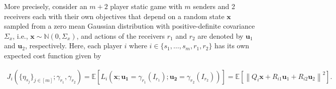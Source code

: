 \documentclass[12pt,journal,onecolumn]{IEEEtran}
\begin{document}
More precisely, consider an $m+2$ player static game with $m$ senders and 2 receivers each with their own objectives that depend on a random state $\boldsymbol{x}$ sampled from a zero mean Gaussian distribution with positive-definite covariance $\Sigma_x$, i.e., $\boldsymbol{x}\sim\mathbb{N}(0,\Sigma_x)$, and actions of the receivers $r_1$ and $r_2$ are denoted by $\boldsymbol{u}_1$ and $\boldsymbol{u}_2$, respectively. %
Here, each player $i$ where $i\in\{s_1,\hdots,s_{m}, r_1,r_2\}$ has its own expected cost function given by

\begin{align}\label{cost_msmr}
    J_i(\{\eta_{s_j}\}_{j\in[m]};\gamma_{r_1},\gamma_{r_2})=\mathbb{E}[L_i(\boldsymbol{x};\boldsymbol{u_1}=\gamma_{r_1}(I_{r_1});\boldsymbol{u_2}=\gamma_{r_2}(I_{r_2}))]=\mathbb{E}\left[\left\|Q_i\boldsymbol{x}+R_{i1}\boldsymbol{u}_1+R_{i2}\boldsymbol{u}_2\right\|^2\right].
\end{align}
\end{document}
